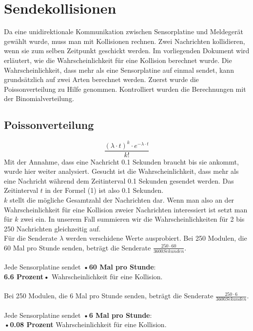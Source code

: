 \documentclass[a4paper]{article} %
\begin{document}
\section{Sendekollisionen}
Da eine unidirektionale Kommunikation zwischen Sensorplatine und Meldegerät gewählt wurde, muss man mit Kollisionen rechnen. Zwei Nachrichten kollidieren, wenn sie zum selben Zeitpunkt geschickt werden. Im vorliegenden Dokument wird erläutert, wie die Wahrscheinlichkeit für eine Kollision berechnet wurde. Die Wahrscheinlichkeit, dass mehr als eine Sensorplatine auf einmal sendet, kann grundsätzlich auf zwei Arten berechnet werden. Zuerst wurde die Poissonverteilung zu Hilfe genommen. Kontrolliert wurden die Berechnungen mit der Binomialverteilung.\\
\subsection{Poissonverteilung}

\begin{equation}
\frac{\left(\lambda\cdot t\right)^k\cdot e^{-\lambda\cdot t}}{k!}
\end{equation}
Mit der Annahme, dass eine Nachricht 0.1 Sekunden braucht bis sie ankommt, wurde hier weiter analysiert. Gesucht ist die Wahrscheinlichkeit, dass mehr als eine Nachricht während dem Zeitinterval 0.1 Sekunden gesendet werden. Das Zeitinterval $t$ in der Formel (1) ist also 0.1 Sekunden.\\
$k$ stellt die mögliche Gesamtzahl der Nachrichten dar. Wenn man also an der Wahrscheinlichkeit für eine Kollision zweier Nachrichten interessiert ist setzt man für $k$ zwei ein. In unserem Fall summieren wir die Wahrscheinlichkeiten für 2 bis 250 Nachrichten gleichzeitig auf.\\
Für die Senderate $\lambda$ werden verschidene Werte ausprobiert. Bei 250 Modulen, die 60 Mal pro Stunde senden, beträgt die Senderate $\frac{250 \cdot 60}{3600Sekunden}$. 
\\\\Jede Sensorplatine sendet \textbf{•60 Mal pro Stunde}: \\ \textbf{6.6 Prozent•} Wahrscheinlichkeit für eine Kollision.\\\\
Bei 250 Modulen, die 6 Mal pro Stunde senden, beträgt die Senderate $\frac{250 \cdot 6}{3600Sekunden}$.
\\\\Jede Sensorplatine sendet \textbf{•6 Mal pro Stunde}: \\ \textbf{•0.08 Prozent} Wahrscheinlichkeit für eine Kollision.\\
\end{document}
